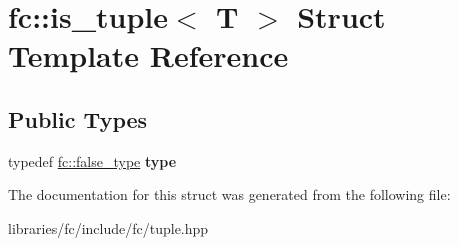\hypertarget{structfc_1_1is__tuple}{}\section{fc\+:\+:is\+\_\+tuple$<$ T $>$ Struct Template Reference}
\label{structfc_1_1is__tuple}
\subsection*{Public Types}
\begin{DoxyCompactItemize}
\item 
\mbox{\label{structfc_1_1is__tuple_a1dc098545fdc4eb7c2bde52cc40f5847}} 
typedef \mbox{\hyperlink{structfc_1_1false__type}{fc\+::false\+\_\+type}} {\bfseries type}
\end{DoxyCompactItemize}


The documentation for this struct was generated from the following file\+:\begin{DoxyCompactItemize}
\item 
libraries/fc/include/fc/tuple.\+hpp\end{DoxyCompactItemize}
